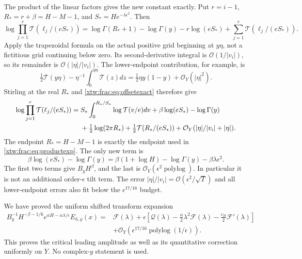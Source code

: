 \documentclass[11pt]{article}
\theoremstyle{remark}\newtheorem{remark}[theorem]{Remark}
\newcommand{\OO}{\mathcal O}
\newcommand{\FF}{\mathcal F}
\newcommand{\QQ}{\mathcal Q}
\newcommand{\TT}{\mathcal T}
\begin{document}
The product of the linear factors gives the new constant exactly. Put
$r=i-1$, $R_*=r+\beta=H-M-1$, and $S_*=He^{-\lambda\epsilon^2}$.
Then
\begin{equation}\label{xtw:frac:eq:offsetexact}
 \log\prod_{j=1}^r\TT(\ell_j/(eS_*))
 =\log\Gamma(R_*+1)-\log\Gamma(y)-r\log(eS_*)
                          +\sum_{j=1}^r\TT(\ell_j/(eS_*)).
\end{equation}
Apply the trapezoidal formula on the actual positive grid beginning at
$y\eta$, not a fictitious grid continuing below zero. Its second-derivative
integral is $\OO(1/|v_i|)$, so its remainder is
$\OO(|\eta|/|v_i|)$. The lower-endpoint contribution, for example, is
\[
 \tfrac12\TT(y\eta)-\eta^{-1}\int_0^{y\eta}\TT(z)dz
       =\tfrac12\eta y(1-y)+\OO_Y(|\eta|^2).
\]
Stirling at the real $R_*$ and \eqref{xtw:frac:eq:offsetexact} therefore give
\begin{align}
 \log\prod_{j=1}^r\TT(\ell_j/(eS_*))
  ={}&S_*\int_0^{R_*/S_*}\log\TT(v/e)dv
       +\beta\log(eS_*)-\log\Gamma(y)\notag\\
    &+\tfrac12\log(2\pi R_*)+\tfrac12\TT(R_*/(eS_*))
             +\OO_Y(|\eta|/|v_i|+|\eta|).\label{xtw:frac:eq:offsetEM}
\end{align}
The endpoint $R_*=H-M-1$ is exactly the endpoint used in
\eqref{xtw:frac:eq:productexp}. The only new term is
\begin{equation}\label{xtw:frac:eq:offsetnew}
 \beta\log(eS_*)-\log\Gamma(y)
 =\beta(1+\log H)-\log\Gamma(y)-\beta\lambda\epsilon^2.
\end{equation}
The first two terms give $B_yH^\beta$, and the last is
$\OO_Y(\epsilon^2\operatorname{polylog})$. In particular it is not an
additional order-$\epsilon$ tilt term. The error
$|\eta|/|v_i|=\OO(\epsilon^2/\sqrt T)$ and all lower-endpoint errors
also fit below the $\epsilon^{17/16}$ budget.

We have proved the uniform shifted transform expansion
\begin{equation}\label{xtw:frac:eq:shiftwindow}
 \begin{split}
 B_y^{-1}H^{-\beta-1/6}e^{\alpha H-\alpha\lambda/\epsilon}E_{h,y}(x)
 ={}&\FF(\lambda)+\epsilon\left[
 \QQ(\lambda)-\frac\alpha2\lambda^2\FF(\lambda)
                         -\frac{c_H}{2}\FF'(\lambda)\right]\\
 &+\OO_Y(\epsilon^{17/16}\operatorname{polylog}(1/\epsilon)).
 \end{split}
\end{equation}
This proves the critical leading amplitude as well as its quantitative
correction uniformly on $Y$. No complex-$y$ statement is used.
\end{document}
